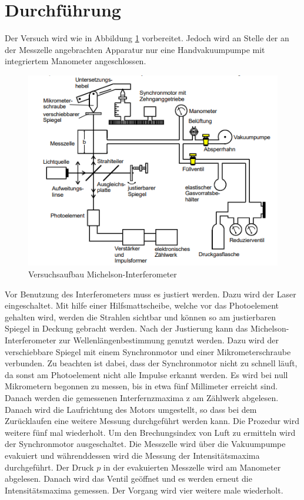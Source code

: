 \section{Durchführung}
\label{sec:Durchführung}
Der Versuch wird wie in Abbildung \ref{fig:Vmi} vorbereitet. Jedoch wird an Stelle der an der Messzelle angebrachten Apparatur nur eine Handvakuumpumpe mit integriertem Manometer angeschlossen.
\begin{figure}
    \centering
    \caption{Versuchsaufbau Michelson-Interferometer \cite{v401}}
    \label{fig:Vmi}
    \includegraphics[width = 0.5 \textwidth]{pics/aufbauvv.png}
\end{figure}
Vor Benutzung des Interferometers muss es justiert werden. Dazu wird der Laser eingeschaltet.
Mit hilfe einer Hilfsmattscheibe, welche vor das Photoelement gehalten wird, werden die Strahlen sichtbar und können so am justierbaren Spiegel in Deckung gebracht werden.
Nach der Justierung kann das Michelson-Interferometer zur Wellenlängenbestimmung genutzt werden. Dazu wird der verschiebbare Spiegel mit einem Synchronmotor und einer Mikrometerschraube verbunden.
Zu beachten ist dabei, dass der Synchronmotor nicht zu schnell läuft, da sonst am Photoelement nicht alle Impulse erkannt werden. Es wird bei null Mikrometern begonnen zu messen, bis in etwa fünf Millimeter erreicht sind.
Danach werden die gemessenen Interfernzmaxima z am Zählwerk abgelesen. Danach wird die Laufrichtung des Motors umgestellt, so dass bei dem Zurücklaufen eine weitere Messung durchgeführt werden kann.
Die Prozedur wird weitere fünf mal wiederholt.
Um den Brechungsindex von Luft zu ermitteln wird der Synchronmotor ausgeschaltet. Die Messzelle wird über die Vakuumpumpe evakuiert und währenddessen wird die Messung der Intensitätsmaxima durchgeführt.
Der Druck $p$ in der evakuierten Messzelle wird am Manometer abgelesen. Danach wird das Ventil geöffnet und es werden erneut die Intensitätsmaxima gemessen.
Der Vorgang wird vier weitere male wiederholt.
